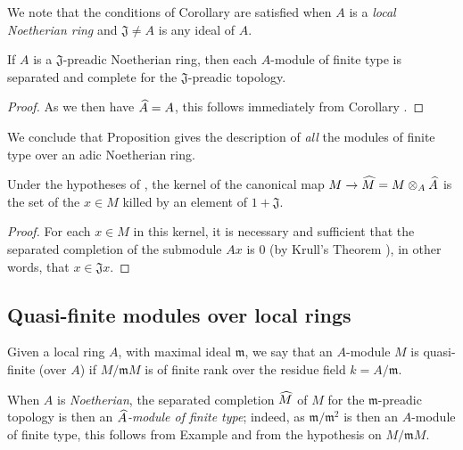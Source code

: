 We note that the conditions of Corollary  are satisfied
when $A$ is a \emph{local Noetherian ring} and $\mathfrak{J}\neq A$ is any ideal of $A$.

\begin{corollary}[7.3.6]
\label{0.7.3.6}
If $A$ is a $\mathfrak{J}$-preadic Noetherian ring, then each $A$-module of finite type
is separated and complete for the $\mathfrak{J}$-preadic topology.
\end{corollary}

\begin{proof}
\label{proof-0.7.3.6}
As we then have $\widehat{A}=A$, this follows immediately from
Corollary .
\end{proof}

We conclude that Proposition  gives the description of
\emph{all} the modules of finite type over an adic Noetherian ring.

\begin{corollary}[7.3.7]
\label{0.7.3.7}
Under the hypotheses of , the kernel of the canonical map
$M\to\wh{M}=M\otimes_A\wh{A}$ is the set of the $x\in M$ killed by an element of
$1+\mathfrak{J}$.
\end{corollary}

\begin{proof}
\label{proof-0.7.3.7}
For each $x\in M$ in this kernel, it is necessary and sufficient that the separated
completion of the submodule $Ax$ is $0$
(by Krull's Theorem ), in other words, that
$x\in\mathfrak{J}x$.
\end{proof}

\subsection{Quasi-finite modules over local rings}
\label{subsection:0.7.4}

\begin{definition}[7.4.1]
\label{0.7.4.1}
Given a local ring $A$, with maximal ideal $\mathfrak{m}$, we say that an $A$-module $M$
is quasi-finite (over $A$) if $M/\mathfrak{m}M$ is of finite rank over the residue field
$k=A/\mathfrak{m}$.
\end{definition}

When $A$ is \emph{Noetherian}, the separated completion $\widehat{M}$ of $M$ for the
$\mathfrak{m}$-preadic topology is then an \emph{$\widehat{A}$-module of finite type};
indeed, as $\mathfrak{m}/\mathfrak{m}^2$ is then an $A$-module of finite type, this follows
from Example  and from the hypothesis on $M/\mathfrak{m}M$.


